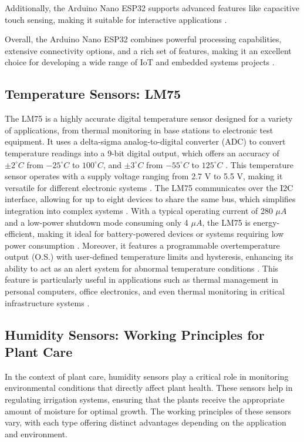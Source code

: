 \documentclass[12pt,a4paper,oneside,english]{book}
\begin{document}
Additionally, the Arduino Nano ESP32 supports advanced features like capacitive touch sensing, making it suitable for interactive applications \citep{arduino2023}.

Overall, the Arduino Nano ESP32 combines powerful processing capabilities, extensive connectivity options, and a rich set of features, making it an excellent choice for developing a wide range of IoT and embedded systems projects \citep{arduino2023}.


\subsection{Temperature Sensors: LM75}
The LM75 is a highly accurate digital temperature sensor designed for a variety of applications, from thermal monitoring in base stations to electronic test equipment. It uses a delta-sigma analog-to-digital converter (ADC) to convert temperature readings into a 9-bit digital output, which offers an accuracy of $\pm 2 ^\circ C$ from $-25^\circ C$ to $100^\circ C$, and $\pm 3^\circ C$ from $-55^\circ C$ to $125^\circ C$ \citep{tiLM75a}. This temperature sensor operates with a supply voltage ranging from 2.7 V to 5.5 V, making it versatile for different electronic systems \citep{tiLM75a}. The LM75 communicates over the I2C interface, allowing for up to eight devices to share the same bus, which simplifies integration into complex systems \citep{tiLM75a}. With a typical operating current of 280 $\mu A$ and a low-power shutdown mode consuming only 4 $\mu A$, the LM75 is energy-efficient, making it ideal for battery-powered devices or systems requiring low power consumption \citep{tiLM75a}. Moreover, it features a programmable overtemperature output (O.S.) with user-defined temperature limits and hysteresis, enhancing its ability to act as an alert system for abnormal temperature conditions \citep{tiLM75a,harvardTempMon}. This feature is particularly useful in applications such as thermal management in personal computers, office electronics, and even thermal monitoring in critical infrastructure systems \citep{universityThermal}.


\subsection{Humidity Sensors: Working Principles for Plant Care}

In the context of plant care, humidity sensors play a critical role in monitoring environmental conditions that directly affect plant health. These sensors help in regulating irrigation systems, ensuring that the plants receive the appropriate amount of moisture for optimal growth. The working principles of these sensors vary, with each type offering distinct advantages depending on the application and environment.
\end{document}
